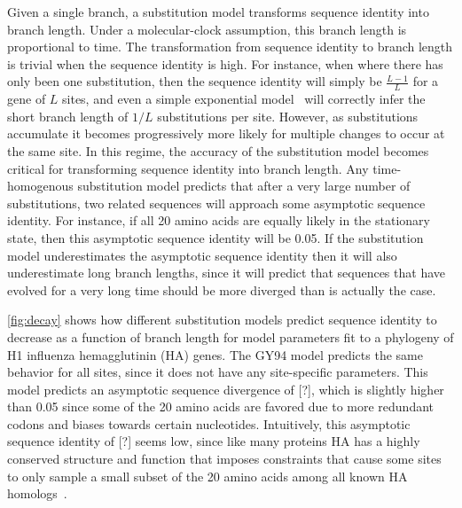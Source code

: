 \documentclass[11pt]{article}
\newcommand\jdbcomment[1]{{\color{red}[#1]}}
\begin{document}
Given a single branch, a substitution model transforms sequence identity into branch length.
Under a molecular-clock assumption, this branch length is proportional to time.
The transformation from sequence identity to branch length is trivial when the sequence identity is high.
For instance, when where there has only been one substitution, then the sequence identity will simply be $\frac{L - 1}{L}$ for a gene of $L$ sites, and even a simple exponential model~\citep{zuckerkandl1965} will correctly infer the short branch length of $1/L$ substitutions per site.
However, as substitutions accumulate it becomes progressively more likely for multiple changes to occur at the same site.
In this regime, the accuracy of the substitution model becomes critical for transforming sequence identity into branch length.
Any time-homogenous substitution model predicts that after a very large number of substitutions, two related sequences will approach some asymptotic sequence identity.
For instance, if all 20 amino acids are equally likely in the stationary state, then this asymptotic sequence identity will be 0.05.
If the substitution model underestimates the asymptotic sequence identity then it will also underestimate long branch lengths, since it will predict that sequences that have evolved for a very long time should be more diverged than is actually the case.

\ref{fig:decay} shows how different substitution models predict sequence identity to decrease as a function of branch length for model parameters fit to a phylogeny of H1 influenza hemagglutinin (HA) genes.
The GY94 model predicts the same behavior for all sites, since it does not have any site-specific parameters.
This model predicts an asymptotic sequence divergence of \jdbcomment{?}, which is slightly higher than 0.05 since some of the 20 amino acids are favored due to more redundant codons and biases towards certain nucleotides.
Intuitively, this asymptotic sequence identity of \jdbcomment{?} seems low, since like many proteins HA has a highly conserved structure and function that imposes constraints that cause some sites to only sample a small subset of the 20 amino acids among all known HA homologs~\citep{nobusawa1991comparison}.
\end{document}
